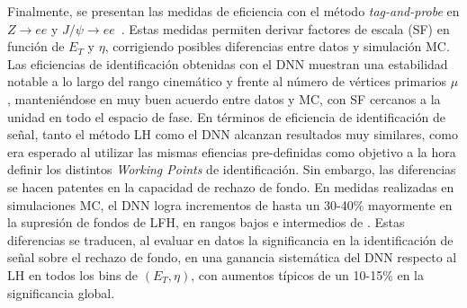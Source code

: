 Finalmente, se presentan las medidas de eficiencia con el método \textit{tag-and-probe} en $Z\to ee$ y $J/\psi\to ee$~\cite{latest_electron_paper_2024}. Estas medidas permiten derivar factores de escala (SF) en función de $E_T$ y $\eta$, corrigiendo posibles diferencias entre datos y simulación MC. Las eficiencias de identificación obtenidas con el DNN muestran una estabilidad notable a lo largo del rango cinemático y frente al número de vértices primarios $\mu$, manteniéndose en muy buen acuerdo entre datos y MC, con SF cercanos a la unidad en todo el espacio de fase.  
En términos de eficiencia de identificación de señal, tanto el método LH como el DNN alcanzan resultados muy similares, como era esperado al utilizar las mismas efiencias pre-definidas como objetivo a la hora definir los distintos \textit{Working Points} de identificación. Sin embargo, las diferencias se hacen patentes en la capacidad de rechazo de fondo. En medidas realizadas en simulaciones MC, el DNN logra incrementos de hasta un 30-40\% mayormente en la supresión de fondos de LFH, en rangos bajos e intermedios de \et. Estas diferencias se traducen, al evaluar en datos la significancia en la identificación de señal sobre el rechazo de fondo, en una ganancia sistemática del DNN respecto al LH en todos los bins de $(E_T,\eta)$, con aumentos típicos de un 10-15\% en la significancia global.
